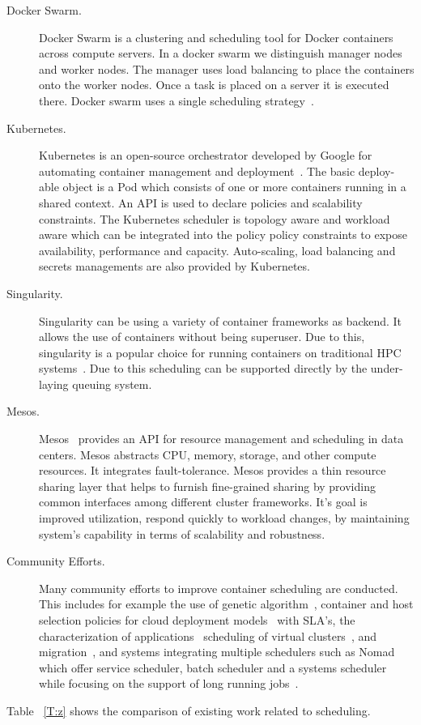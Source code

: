 \documentclass[final,5p,times,twocolumn]{elsarticle}
\begin{document}
\begin{description}


\item[Docker Swarm.] Docker Swarm is a clustering and scheduling
tool for Docker containers~\cite{Dockerswarmengine2018} across compute
servers. In a docker swarm we distinguish manager nodes and worker
nodes. The manager uses load balancing to place the containers onto
the worker nodes. Once a task is placed on a server it is executed
there.  Docker swarm uses a single scheduling
strategy~\cite{Dockerswarm2018}.



\item[Kubernetes.] Kubernetes is an open-source orchestrator
developed by Google for automating container management and
deployment~\cite{Kubernates2018}. The basic deploy-able object is a
Pod which consists of one or more containers running in a shared
context. An API is used to declare policies and scalability
constraints. The Kubernetes scheduler is topology aware and workload
aware which can be integrated into the policy policy constraints to
expose availability, performance and capacity. Auto-scaling, load
balancing and secrets managements are also provided by Kubernetes.

\item[Singularity.] Singularity can be using a variety of
container frameworks as backend. It allows the use of containers
without being superuser. Due to this, singularity is a popular choice
for running containers on traditional HPC
systems~\cite{www-singularity}. Due to this scheduling can be
supported directly by the under-laying queuing system.


\item[Mesos.] Mesos~\cite{hindman2011mesos,Mesos2018} provides an
API for resource management and scheduling in data centers. Mesos
abstracts CPU, memory, storage, and other compute resources. It
integrates fault-tolerance. Mesos provides a thin resource sharing
layer that helps to furnish fine-grained sharing by providing common
interfaces among different cluster frameworks. It's goal is improved
utilization, respond quickly to workload changes, by maintaining
system's capability in terms of scalability and robustness.


\item[Community Efforts.] Many community efforts to improve
container scheduling are conducted. This includes for example the use
of genetic algorithm~\cite{guerrero2018genetic}, container and host
selection policies for cloud deployment models~\cite{hanafy2017novel}
with SLA's, the characterization of
applications~\cite{medel2017client} scheduling of virtual
clusters~\cite{dziurzanskivalue}, and migration~\cite{Flocker2018},
and systems integrating multiple schedulers such as Nomad which offer
service scheduler, batch scheduler and a systems scheduler while
focusing on the support of long running jobs~\cite{Nomad2018}.
\end{description}
Table ~\ref{T:z} shows the comparison of existing work related to scheduling. 
\end{document}
